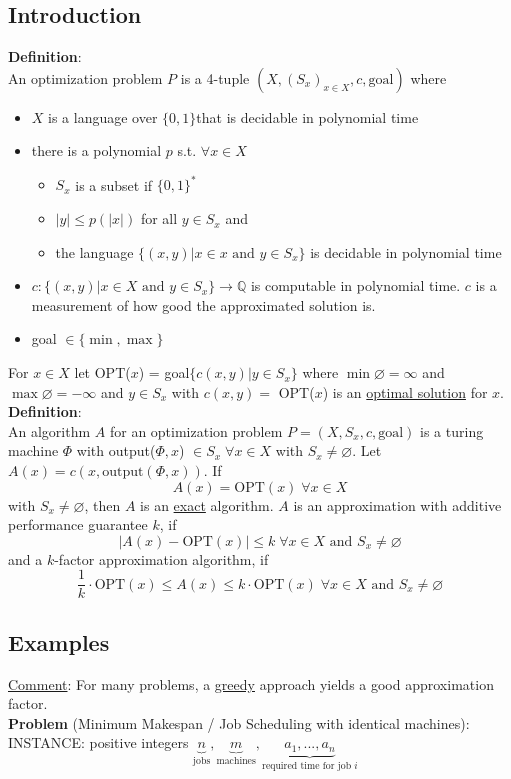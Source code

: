 \documentclass[a4paper, 12pt]{article}
\begin{document}
	\subsection{Introduction}
	\textbf{Definition}:\\
	An optimization problem $P$ is a 4-tuple $(X, (S_x)_{x\in X}, c, \text{goal})$ where \begin{itemize}
		\item $X$ is a language over $\{0,1\}$that is decidable in polynomial time\item there is a polynomial $p$ s.t. $\forall x \in X$ \begin{itemize}
			\item $S_x$ is a subset if $\{0,1\}^*$
			\item $\left|y\right| \leq p(\left|x\right|)$ for all $y\in S_x$ and 
			\item the language $\{(x,y)| x \in x \text{ and } y\in S_x\}$ is decidable in polynomial time
		\end{itemize}
	\item $c: \{(x,y)|x \in X \text{ and } y \in S_x\} \to \mathbb{Q}$ is computable in polynomial time. $c$ is a measurement of how good the approximated solution is.
	\item goal $\in \{\min, \max\}$
	\end{itemize}
	For $x \in X$ let OPT($x$) = goal$\{c(x,y)|y\in S_x\}$ where $\min \varnothing = \infty$ and $\max \varnothing = -\infty$ and $y \in S_x$ with $c(x,y) =$ OPT($x$) is an \underline{optimal solution} for $x$.\\
	\textbf{Definition}:\\
	An algorithm $A$ for an optimization problem $P=(X,S_x,c,\text{goal})$ is a turing machine $\Phi$ with output($\Phi, x$) $\in S_x \; \forall x \in X$ with $S_x \neq \varnothing$. Let $A(x) = c(x,\text{output}(\Phi,x))$. If \[A(x) = \text{OPT}(x) \; \forall x \in X\] with $S_x \neq \varnothing$, then $A$ is an \underline{exact} algorithm. $A$ is an approximation with additive performance guarantee $k$, if \[\left|A(x) - \text{OPT}(x)\right| \leq k \; \forall x \in X \text{ and } S_x \neq \varnothing\] and a $k$-factor approximation algorithm, if \[\frac{1}{k}\cdot \text{OPT}(x) \leq A(x) \leq k\cdot\text{OPT}(x) \; \forall x \in X \text{ and } S_x \neq \varnothing\]
	\subsection{Examples}
	\underline{Comment}: For many problems, a \underline{greedy} approach yields a good approximation factor.\\
	\textbf{Problem} (Minimum Makespan / Job Scheduling with identical machines):\\
	INSTANCE: positive integers $\underbrace{n}_{\text{jobs}},\underbrace{m}_{\text{machines}},\underbrace{a_1,...,a_n}_{\text{required time for job $i$}}$\\
\end{document}
